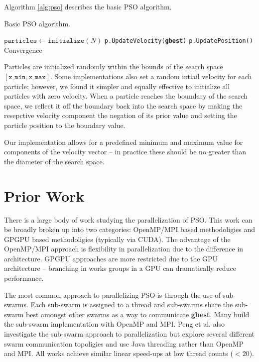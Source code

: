 Algorithm \ref{alg:pso} describes the basic PSO algorithm.

\begin{algorithm}
  \caption{Basic PSO algorithm.}\label{alg:pso}
  \begin{algorithmic}[1]
    \State $\texttt{particles} \gets \texttt{initialize}(N)$
    \Repeat
    \State \texttt{p.UpdateVelocity(\textbf{gbest})}
    \State \texttt{p.UpdatePosition()}
    \EndFor
    \Until Convergence
    \EndProcedure
  \end{algorithmic}
\end{algorithm}

Particles are initialized randomly within the bounds of the search space
$[\texttt{x\_min}, \texttt{x\_max}]$. Some implementations also set a random
intiail velocity for each particle; however, we found it simpler and equally
effective to initialize all particles with zero velocity. When a particle
reaches the boundary of the search space, we reflect it off the boundary back
into the search space by making the resepctive velocity component the negation
of its prior value and setting the particle position to the boundary value.

Our implementation allows for a predefined minimum and maximum value for
components of the velocity vector -- in practice these should be no greater than
the diameter of the search space.
\section{Prior Work}
There is a large body of work studying the parallelization of PSO. This work can
be broadly broken up into two categories: OpenMP/MPI based methodoligies and
GPGPU based methodoligies (typically via CUDA). The advantage of the OpenMP/MPI
approach is flexibility in parallelization due to the difference in
architecture. GPGPU approaches are more restricted due to the GPU architecture
-- branching in works groups in a GPU can dramatically reduce performance.

The most common approach to parallelizing PSO is through the use of
sub-swarms. Each sub-swarm is assigned to a thread and sub-swarms share the
sub-swarm best amongst other swarms as a way to communicate
\textbf{gbest}. Many \cite{cooppso, comppso, optionpso}
build the sub-swarm implementation with OpenMP and MPI. Peng et
al. \cite{multicore-pso} also investigate the sub-swarm approach to
parallelization but explore several different swarm communication topoligies and
use Java threading rather than OpenMP and MPI. All works achieve similar linear
speed-ups at low thread counts ($<20$).

